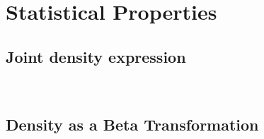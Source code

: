 \section{Statistical Properties}
\subsection{Joint density expression}
\


\subsection{Density as a Beta Transformation}
